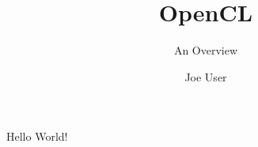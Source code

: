 \documentclass{scrartcl}
\title{OpenCL}
\subtitle{An Overview}
\author{Joe User}
\begin{document}
\maketitle

Hello World!
\end{document}
